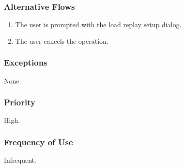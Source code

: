 \documentclass[a4paper,11pt,titlepage]{article}
\begin{document}
\subsubsection{Alternative Flows}

\begin{enumerate}
  \item The user is prompted with the load replay setup dialog.
  \item The user cancels the operation.
\end{enumerate}

\subsubsection{Exceptions}
None.

\subsubsection{Priority}
High.

\subsubsection{Frequency of Use}
Infrequent.
\end{document}
